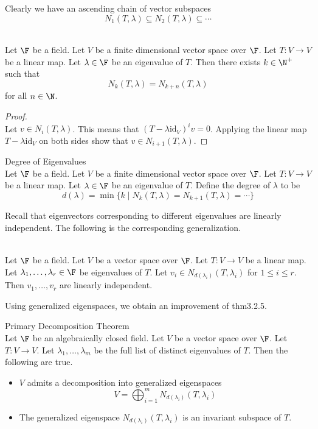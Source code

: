 \documentclass[a4paper]{article}
\begin{document}
Clearly we have an ascending chain of vector subspaces $$N_1(T,\lambda)\subseteq N_2(T,\lambda)\subseteq\cdots$$

\begin{prp}{}{}\\
Let $\F$ be a field. Let $V$ be a finite dimensional vector space over $\F$. Let $T:V\to V$ be a linear map. Let $\lambda\in\F$ be an eigenvalue of $T$. Then there exists $k\in\N^+$ such that $$N_k(T,\lambda)=N_{k+n}(T,\lambda)$$ for all $n\in\N$. 
\begin{proof}\\
Let $v\in N_i(T,\lambda)$. This means that $(T-\lambda\text{id}_V)^iv=0$. Applying the linear map $T-\lambda\text{id}_V$ on both sides show that $v\in N_{i+1}(T,\lambda)$. 
\end{proof}
\end{prp}

\begin{defn}{Degree of Eigenvalues}{}\\
Let $\F$ be a field. Let $V$ be a finite dimensional vector space over $\F$. Let $T:V\to V$ be a linear map. Let $\lambda\in\F$ be an eigenvalue of $T$. Define the degree of $\lambda$ to be $$d(\lambda)=\min\{k\;|\;N_k(T,\lambda)=N_{k+1}(T,\lambda)=\cdots\}$$
\end{defn}

Recall that eigenvectors corresponding to different eigenvalues are linearly independent. The following is the corresponding generalization. 

\begin{prp}{}{}\\
Let $\F$ be a field. Let $V$ be a vector space over $\F$. Let $T:V\to V$ be a linear map. Let $\lambda_1,\dots,\lambda_r\in\F$ be eigenvalues of $T$. Let $v_i\in N_{d(\lambda_i)}(T,\lambda_i)$ for $1\leq i\leq r$. Then $v_1,\dots,v_r$ are linearly independent. 
\end{prp}

Using generalized eigenspaces, we obtain an improvement of thm3.2.5. 

\begin{thm}{Primary Decomposition Theorem}{}\\
Let $\F$ be an algebraically closed field. Let $V$ be a vector space over $\F$. Let $T:V\to V$. Let $\lambda_1,\dots,\lambda_m$ be the full list of distinct eigenvalues of $T$. Then the following are true. 
\begin{itemize}
\item $V$ admits a decomposition into generalized eigenspaces $$V=\bigoplus_{i=1}^mN_{d(\lambda_i)}(T,\lambda_i)$$
\item The generalized eigenspace $N_{d(\lambda_i)}(T,\lambda_i)$ is an invariant subspace of $T$. 
\end{itemize}
\end{thm}
\end{document}
